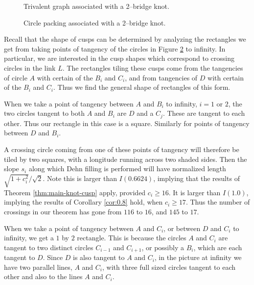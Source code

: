 \begin{figure}
  \begin{center}
  
  \end{center}
  \caption{Trivalent graph associated with a 2--bridge knot.}
  \label{fig:2bridge_tri}
\end{figure}

\begin{figure}
  \begin{center}
  
  \end{center}
  \caption{Circle packing associated with a 2--bridge knot.}
  \label{fig:2bridge_circ}
\end{figure}

Recall that the shape of cusps can be determined by analyzing the
rectangles we get from taking points of tangency of the circles in
Figure \ref{fig:2bridge_circ} to infinity.  In particular, we are
interested in the cusp shapes which correspond to crossing circles in
the link $L$.  The rectangles tiling these cusps come from the
tangencies of circle $A$ with certain of the $B_i$ and $C_i$, and from
tangencies of $D$ with certain of the $B_i$ and $C_i$.  Thus we find
the general shape of rectangles of this form.

When we take a point of tangency between $A$ and $B_i$ to infinity,
$i=1$ or $2$, the two circles tangent to both $A$ and $B_i$ are $D$
and a $C_j$.  These are tangent to each other.  Thus our rectangle in
this case is a square.  Similarly for points of tangency between $D$
and $B_i$.

A crossing circle coming from one of these points of tangency will
therefore be tiled by two squares, with a longitude running across two
shaded sides.  Then the slope $s_i$ along which Dehn filling is
performed will have normalized length $\sqrt{1+c_i^2}/\sqrt{2}$.  Note
this is larger than $I(0.6624)$, implying that the results of Theorem
\ref{thm:main-knot-cusp} apply, provided $c_i \geq 16$.  It is larger
than $I(1.0)$, implying the results of Corollary \ref{cor:0.8} hold,
when $c_i \geq 17$.  Thus the number of crossings in our theorem has
gone from $116$ to $16$, and $145$ to $17$.

When we take a point of tangency between $A$ and $C_i$, or between $D$
and $C_i$ to infinity, we get a $1$ by $2$ rectangle.  This is because
the circles $A$ and $C_i$ are tangent to two distinct circles
$C_{i-1}$ and $C_{i+1}$, or possibly a $B_i$, which are each tangent
to $D$.  Since $D$ is also tangent to $A$ and $C_i$, in the picture at
infinity we have two parallel lines, $A$ and $C_i$, with three full
sized circles tangent to each other and also to the lines $A$ and
$C_i$.

